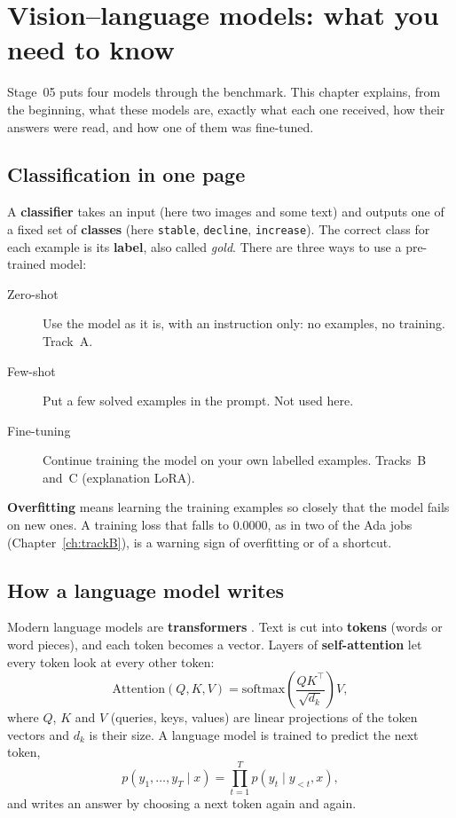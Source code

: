 \chapter{Vision--language models: what you need to know}
\label{ch:models}

Stage~05 puts four models through the benchmark. This chapter explains, from the beginning, what these models are, exactly what each one received, how their answers were read, and how one of them was fine-tuned.

\section{Classification in one page}

A \textbf{classifier} takes an input (here two images and some text) and outputs one of a fixed set of \textbf{classes} (here \texttt{stable}, \texttt{decline}, \texttt{increase}). The correct class for each example is its \textbf{label}, also called \emph{gold}. There are three ways to use a pre-trained model:

\begin{description}
  \item[Zero-shot] Use the model as it is, with an instruction only: no examples, no training. Track~A.
  \item[Few-shot] Put a few solved examples in the prompt. Not used here.
  \item[Fine-tuning] Continue training the model on your own labelled examples. Tracks~B and~C (explanation LoRA).
\end{description}

\textbf{Overfitting} means learning the training examples so closely that the model fails on new ones. A training loss that falls to 0.0000, as in two of the Ada jobs (Chapter~\ref{ch:trackB}), is a warning sign of overfitting or of a shortcut.

\section{How a language model writes}

Modern language models are \textbf{transformers} \citep{vaswani2017}. Text is cut into \textbf{tokens} (words or word pieces), and each token becomes a vector. Layers of \textbf{self-attention} let every token look at every other token:
\begin{equation}
\mathrm{Attention}(Q,K,V) = \mathrm{softmax}\!\left(\frac{QK^\top}{\sqrt{d_k}}\right)V ,
\end{equation}
where $Q$, $K$ and $V$ (queries, keys, values) are linear projections of the token vectors and $d_k$ is their size. A language model is trained to predict the next token,
\begin{equation}
p(y_1,\dots,y_T \mid x) = \prod_{t=1}^{T} p(y_t \mid y_{<t}, x),
\end{equation}
and writes an answer by choosing a next token again and again.

